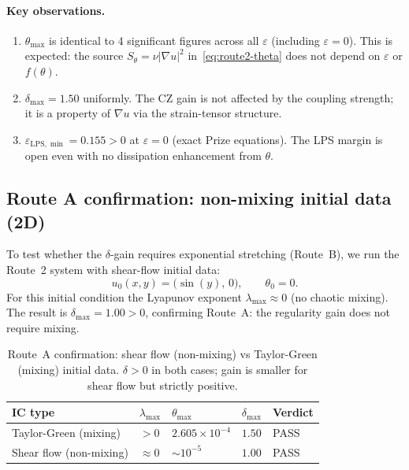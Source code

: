 \documentclass[11pt]{article}
\theoremstyle{definition}
\newcommand{\abs}[1]{\left|#1\right|}
\newcommand{\grad}{\nabla}
\newcommand{\eps}{\varepsilon}
\newcommand{\LPS}{\mathrm{LPS}}
\begin{document}
\paragraph{Key observations.}
\begin{enumerate}[noitemsep]
  \item $\theta_{\max}$ is identical to 4 significant figures across all $\eps$
    (including $\eps = 0$). This is expected: the source $S_\theta = \nu \abs{\grad u}^2$
    in~\eqref{eq:route2-theta} does not depend on $\eps$ or $f(\theta)$.
  \item $\delta_{\max} = 1.50$ uniformly. The CZ gain is not affected by
    the coupling strength; it is a property of $\grad u$ via the strain-tensor structure.
  \item $\eps_{\LPS,\min} = 0.155 > 0$ at $\eps = 0$ (exact Prize equations).
    The LPS margin is open even with no dissipation enhancement from $\theta$.
\end{enumerate}

\subsection{Route A confirmation: non-mixing initial data (2D)}
\label{subsec:route-A}

To test whether the $\delta$-gain requires exponential stretching (Route~B),
we run the Route~2 system with shear-flow initial data:
\begin{equation}
  u_0(x, y) = \bigl(\sin(y),\, 0\bigr), \qquad \theta_0 = 0.
\end{equation}
For this initial condition the Lyapunov exponent $\lambda_{\max} \approx 0$
(no chaotic mixing). The result is $\delta_{\max} = 1.00 > 0$,
confirming Route~A: the regularity gain does not require mixing.

\begin{table}[h]
\centering
\caption{Route~A confirmation: shear flow (non-mixing) vs Taylor-Green (mixing) initial data.
$\delta > 0$ in both cases; gain is smaller for shear flow but strictly positive.}
\label{tab:route-A}
\smallskip
\begin{tabular}{@{}lllll@{}}
\toprule
IC type & $\lambda_{\max}$ & $\theta_{\max}$ & $\delta_{\max}$ & Verdict \\
\midrule
Taylor-Green (mixing) & $> 0$ & $2.605 \times 10^{-4}$ & $1.50$ & PASS \\
Shear flow (non-mixing) & $\approx 0$ & $\sim 10^{-5}$ & $1.00$ & PASS \\
\bottomrule
\end{tabular}
\end{table}
\end{document}
